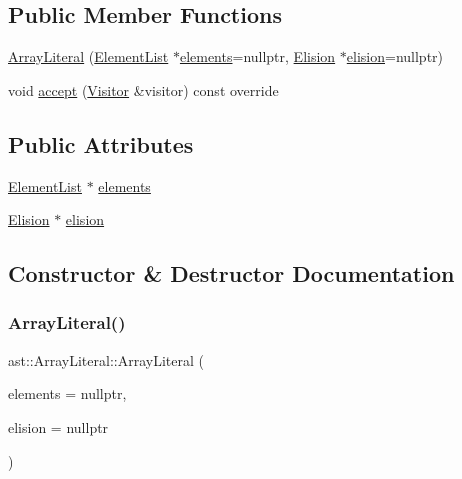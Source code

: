 \subsection*{Public Member Functions}
\begin{DoxyCompactItemize}
\item 
\hyperlink{structast_1_1_array_literal_afee8504dca1587e8e0f9df5dd7a5ad05}{Array\+Literal} (\hyperlink{structast_1_1_element_list}{Element\+List} $\ast$\hyperlink{structast_1_1_array_literal_a3654b169349b3d309f65da79158dad56}{elements}=nullptr, \hyperlink{structast_1_1_elision}{Elision} $\ast$\hyperlink{structast_1_1_array_literal_ab6c8555816219a172d2b5c44dcbcf8d2}{elision}=nullptr)
\item 
void \hyperlink{structast_1_1_array_literal_a1efd88bd53842200c4b11d8afc17042f}{accept} (\hyperlink{structast_1_1_visitor}{Visitor} \&visitor) const override
\end{DoxyCompactItemize}
\subsection*{Public Attributes}
\begin{DoxyCompactItemize}
\item 
\hyperlink{structast_1_1_element_list}{Element\+List} $\ast$ \hyperlink{structast_1_1_array_literal_a3654b169349b3d309f65da79158dad56}{elements}
\item 
\hyperlink{structast_1_1_elision}{Elision} $\ast$ \hyperlink{structast_1_1_array_literal_ab6c8555816219a172d2b5c44dcbcf8d2}{elision}
\end{DoxyCompactItemize}


\subsection{Constructor \& Destructor Documentation}
\mbox{\label{structast_1_1_array_literal_afee8504dca1587e8e0f9df5dd7a5ad05}} 
\subsubsection{\texorpdfstring{Array\+Literal()}{ArrayLiteral()}}
{\footnotesize\ttfamily ast\+::\+Array\+Literal\+::\+Array\+Literal (\begin{DoxyParamCaption}\item[{\hyperlink{structast_1_1_element_list}{Element\+List} $\ast$}]{elements = {\ttfamily nullptr},  }\item[{\hyperlink{structast_1_1_elision}{Elision} $\ast$}]{elision = {\ttfamily nullptr} }\end{DoxyParamCaption})\hspace{0.3cm}{\ttfamily [inline]}}



